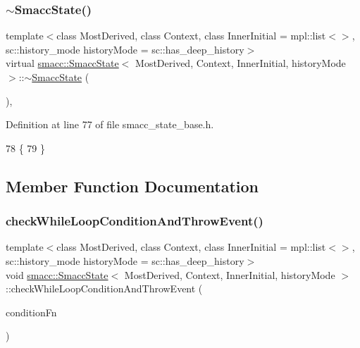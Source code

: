 \subsubsection{\texorpdfstring{$\sim$\+Smacc\+State()}{~SmaccState()}}
{\footnotesize\ttfamily template$<$class Most\+Derived, class Context, class Inner\+Initial = mpl\+::list$<$$>$, sc\+::history\+\_\+mode history\+Mode = sc\+::has\+\_\+deep\+\_\+history$>$ \\
virtual \hyperlink{classsmacc_1_1SmaccState}{smacc\+::\+Smacc\+State}$<$ Most\+Derived, Context, Inner\+Initial, history\+Mode $>$\+::$\sim$\hyperlink{classsmacc_1_1SmaccState}{Smacc\+State} (\begin{DoxyParamCaption}{ }\end{DoxyParamCaption})\hspace{0.3cm}{\ttfamily [inline]}, {\ttfamily [virtual]}}



Definition at line 77 of file smacc\+\_\+state\+\_\+base.\+h.


\begin{DoxyCode}
78     \{
79     \}
\end{DoxyCode}


\subsection{Member Function Documentation}
\mbox{\label{classsmacc_1_1SmaccState_a80082718f226bebedb589f0c4696001d}} 
\subsubsection{\texorpdfstring{check\+While\+Loop\+Condition\+And\+Throw\+Event()}{checkWhileLoopConditionAndThrowEvent()}}
{\footnotesize\ttfamily template$<$class Most\+Derived, class Context, class Inner\+Initial = mpl\+::list$<$$>$, sc\+::history\+\_\+mode history\+Mode = sc\+::has\+\_\+deep\+\_\+history$>$ \\
void \hyperlink{classsmacc_1_1SmaccState}{smacc\+::\+Smacc\+State}$<$ Most\+Derived, Context, Inner\+Initial, history\+Mode $>$\+::check\+While\+Loop\+Condition\+And\+Throw\+Event (\begin{DoxyParamCaption}\item[{\hyperlink{classbool}{bool}(Most\+Derived\+::$\ast$)()}]{condition\+Fn }\end{DoxyParamCaption})\hspace{0.3cm}{\ttfamily [inline]}}



